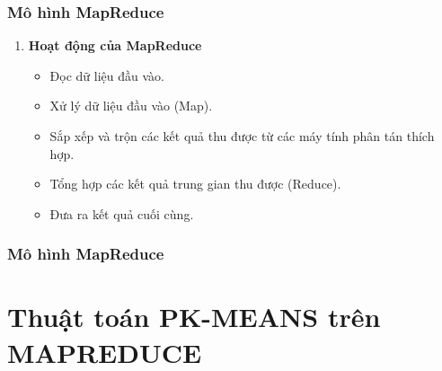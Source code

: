 \documentclass[12pt]{beamer}
\begin{document}
	\begin{frame}
		\frametitle{Mô hình MapReduce}
		\begin{enumerate} [\textbf{4.}]
			\item \textbf{Hoạt động của MapReduce}
				\begin{itemize}
					\item Đọc dữ liệu đầu vào.
					\item Xử lý dữ liệu đầu vào (Map).
					\item Sắp xếp và trộn các kết quả thu được từ các máy tính phân tán thích hợp.
					\item Tổng hợp các kết quả trung gian thu được (Reduce).
					\item Đưa ra kết quả cuối cùng.
				\end{itemize}
		\end{enumerate}
	\end{frame}
	
	\begin{frame}
		\frametitle{Mô hình MapReduce}
	\end{frame}
	
	\section{Thuật toán PK-MEANS trên MAPREDUCE}
\end{document}
